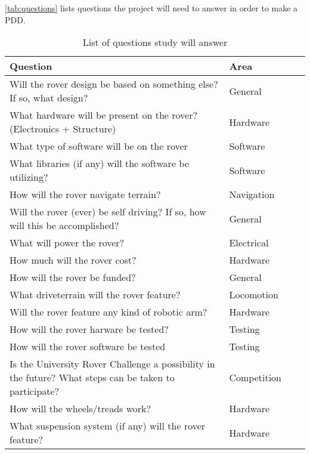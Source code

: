 \documentclass[conference]{IEEEtran} %
\begin{document}
\autoref{tab:questions} lists questions the project will need to answer in order to make a PDD.

\begin{table*}
    \caption{List of questions study will answer}
    \centering
    \begin{tabular}{@{}llcc@{}}
        \toprule %
        Question & Area \\
        \midrule %
        Will the rover design be based on something else? If so, what design? & General \\
        What hardware will be present on the rover? (Electronics + Structure) & Hardware \\
        What type of software will be on the rover & Software \\
        What libraries (if any) will the software be utilizing? & Software \\ 
        How will the rover navigate terrain? & Navigation \\
        Will the rover (ever) be self driving? If so, how will this be accomplished? & General \\
        What will power the rover? & Electrical \\
        How much will the rover cost? & Hardware \\
        How will the rover be funded? & General \\
        What driveterrain will the rover feature? & Locomotion \\
        Will the rover feature any kind of robotic arm? & Hardware \\
        How will the rover harware be tested? & Testing \\
        How will the rover software be tested & Testing \\
        Is the University Rover Challenge a possibility in the future? What steps can be taken to participate? & Competition \\
        How will the wheels/treads work? & Hardware \\
        What suspension system (if any) will the rover feature? & Hardware \\

\end{tabular}
\end{table*}
\end{document}
